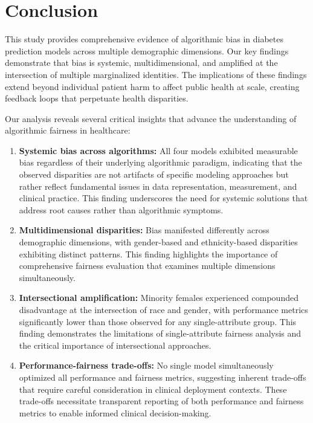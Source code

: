 
\section{Conclusion}

This study provides comprehensive evidence of algorithmic bias in diabetes 
prediction models across multiple demographic dimensions. Our key findings 
demonstrate that bias is systemic, multidimensional, and amplified at the 
intersection of multiple marginalized identities. The implications of these 
findings extend beyond individual patient harm to affect public health at 
scale, creating feedback loops that perpetuate health disparities.

Our analysis reveals several critical insights that advance the understanding 
of algorithmic fairness in healthcare:

\begin{enumerate}[leftmargin=*]
    \item \textbf{Systemic bias across algorithms:} All four models exhibited 
          measurable bias regardless of their underlying algorithmic paradigm, 
          indicating that the observed disparities are not artifacts of specific 
          modeling approaches but rather reflect fundamental issues in data 
          representation, measurement, and clinical practice. This finding 
          underscores the need for systemic solutions that address root causes 
          rather than algorithmic symptoms.
    \item \textbf{Multidimensional disparities:} Bias manifested differently 
          across demographic dimensions, with gender-based and ethnicity-based 
          disparities exhibiting distinct patterns. This finding highlights the 
          importance of comprehensive fairness evaluation that examines multiple 
          dimensions simultaneously.
    \item \textbf{Intersectional amplification:} Minority females experienced 
          compounded disadvantage at the intersection of race and gender, with 
          performance metrics significantly lower than those observed for any 
          single-attribute group. This finding demonstrates the limitations of 
          single-attribute fairness analysis and the critical importance of 
          intersectional approaches.
    \item \textbf{Performance-fairness trade-offs:} No single model 
          simultaneously optimized all performance and fairness metrics, 
          suggesting inherent trade-offs that require careful consideration in 
          clinical deployment contexts. These trade-offs necessitate transparent 
          reporting of both performance and fairness metrics to enable informed 
          clinical decision-making.
\end{enumerate}

